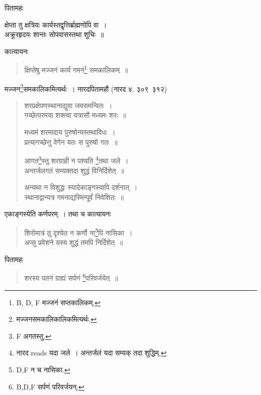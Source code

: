 \documentclass[11pt, openany]{book}
\begin{document}
\newpage

पितामहः 

\begin{quote}
{\vy }
\end{quote}
क्षेप्ता तु क्षत्रियः कार्यस्तद्वृत्तिर्ब्राह्मणोपि वा~।\\
अक्रूरहृदयः शान्तः सोपवासस्तथा शुचिः~॥

कात्यायनः 

\begin{quote}
{\vy क्षिप्तेषु मज्जनं कार्य गमनं\renewcommand{\thefootnote}{1}\footnote{B, D, F मज्जनं सप्तकालिकम्.} समकालिकम्~॥}
\end{quote}

मज्जन\renewcommand{\thefootnote}{2}\footnote{मज्जनसमकालिकालिकमित्यर्थः.}समकालिकमित्यर्थः~। नारदपितामहौ (नारद ४. ३०९\textendash\ ३१२)

\begin{quote}
{\vy शरप्रक्षेपणस्थानाद्युवा जवसमन्वितः~।\\
गच्छेत्परमया शक्त्या यत्रासौ मध्यमः शरः~॥

मध्यमं शरमादाय पुरुषोन्यस्तथाविधः~।\\
प्रत्यागच्छेत्तु वेगेन यतः स पुरुषो गतः~॥

आगत\renewcommand{\thefootnote}{3}\footnote{F अगतस्तु.}स्तु शरग्राही न पश्यति \renewcommand{\thefootnote}{4}\footnote{नारद reads यदा जले~। अन्तर्जलं यदा सम्यक् तदा शुद्धिम्.}तथा जले~।\\
अन्तर्जलगतं सम्यक्तदा शुद्धं विनिर्दिशेत्~॥

अन्यथा न विशुद्धः स्यादेकाङ्गस्यापि दर्शनात्~।\\
स्थानाद्वान्यत्र गमनाद्यस्मिन्पूर्वं निवेशितः~॥}
\end{quote}

एकाङ्गस्येति कर्णपरम्~। तथा च कात्यायनः

\begin{quote}
{\vy शिरोमात्रं तु दृश्येत न कर्णौ ना\renewcommand{\thefootnote}{5}\footnote{D,F न च नासिका.}पि नासिका~।\\
अप्सु प्रवेशने यस्य शुद्धं तमपि निर्दिशेत्~॥}
\end{quote}

पितामहः 

\begin{quote}
{\vy शरस्य पतनं ग्राह्यं सर्पणं \renewcommand{\thefootnote}{6}\footnote{B,D,F सर्पणं परिवर्जयन्.}परिवर्जयेत्~॥}
\end{quote}
\end{document}
